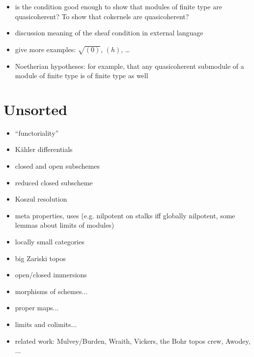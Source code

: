 \documentclass[10pt]{amsart}
\theoremstyle{definition}
\theoremstyle{plain}
\theoremstyle{remark}
\newcommand{\?}{\,{:}\,}
\renewcommand{\_}{\mathpunct{.}\,}
\begin{document}
\begin{itemize}
\item is the condition good enough to show that modules of finite type are
quasicoherent? To show that cokernels are quasicoherent?
\item discussion meaning of the sheaf condition in external language
\item give more examples: $\sqrt{(0)}$, $(h)$, \ldots
\item Noetherian hypotheses: for example, that any quasicoherent submodule of a
module of finite type is of finite type as well
\end{itemize}


\section{Unsorted}
\begin{itemize}
\item ``functoriality''
\item Kähler differentials
\item closed and open subschemes
\item reduced closed subscheme
\item Koszul resolution
\item meta properties, uses (e.g. nilpotent on stalks iff globally nilpotent,
some lemmas about limits of modules)
\item locally small categories
\item big Zariski topos
\item open/closed immersions
\item morphisms of schemes...
\item proper maps...
\item limits and colimits...
\item related work: Mulvey/Burden, Wraith, Vickers, the Bohr topos crew, Awodey, ...
\end{itemize}
\end{document}
